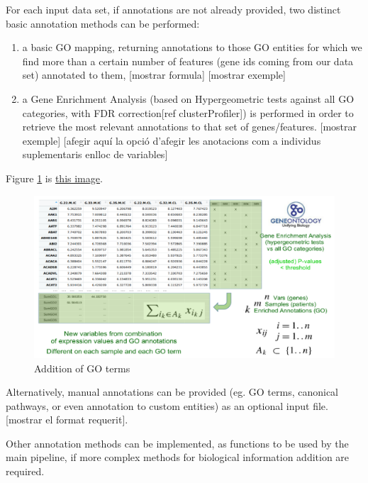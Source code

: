 \documentclass[a4paper, nobind]{templates/ociamthesis}
\begin{document}
For each input data set, if annotations are not already provided, two distinct basic annotation methods can be performed:

\begin{enumerate}
\def\labelenumi{(\roman{enumi})}
\item
  a basic GO mapping, returning annotations to those GO entities for which we find more than a certain number of features (gene ids coming from our data set) annotated to them, {[}mostrar formula{]} {[}mostrar exemple{]}
\item
  a Gene Enrichment Analysis (based on Hypergeometric tests against all GO categories, with FDR correction{[}ref clusterProfiler{]}) is performed in order to retrieve the most relevant annotations to that set of genes/features. {[}mostrar exemple{]}
  {[}afegir aquí la opció d'afegir les anotacions com a individus suplementaris enlloc de variables{]}
\end{enumerate}

Figure \ref{fig:fig3-1} is \protect\hyperlink{fig:fig3-1}{this image}.

\begin{figure}

{\centering \includegraphics[width=0.95\linewidth]{figures/chapter1/addition_of_GO_terms} 

}

\caption{Addition of GO terms}\label{fig:fig3-1}
\end{figure}

Alternatively, manual annotations can be provided (eg. GO terms, canonical pathways, or even annotation to custom entities) as an optional input file. {[}mostrar el format requerit{]}.

Other annotation methods can be implemented, as functions to be used by the main pipeline, if more complex methods for biological information addition are required.
\end{document}
